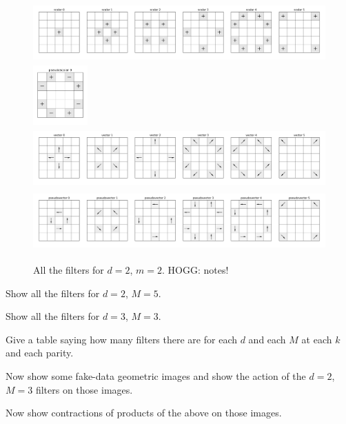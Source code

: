 \documentclass{article}
\theoremstyle{plain}
\begin{document}
\begin{figure}[tp]
\includegraphics[height=0.9in]{notebooks/scalar_2_5_0.png}\\
\includegraphics[height=0.9in]{notebooks/pseudoscalar_2_5_0.png}\\
\includegraphics[height=0.9in]{notebooks/vector_2_5_1.png}\\
\includegraphics[height=0.9in]{notebooks/pseudovector_2_5_1.png}
\caption{All the filters for $d=2$, $m=2$. HOGG: notes!}
\end{figure}

Show all the filters for $d=2$, $M=5$.

Show all the filters for $d=3$, $M=3$.

Give a table saying how many filters there are for each $d$ and each $M$ at each $k$ and each parity.

Now show some fake-data geometric images and show the action of the $d=2$, $M=3$ filters on those images.

Now show contractions of products of the above on those images.
\end{document}
